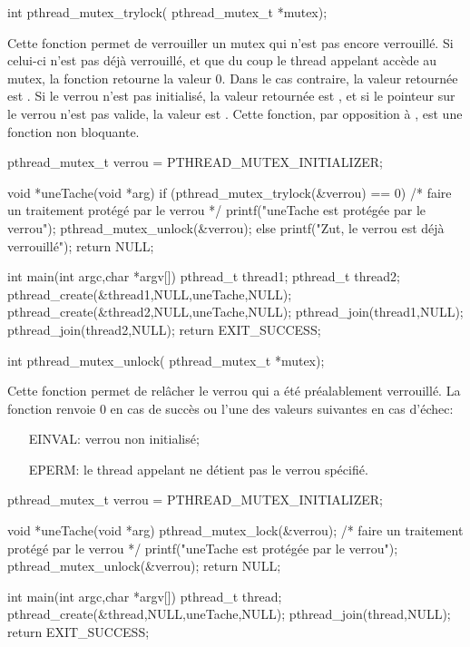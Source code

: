 \label{func:pthread_mutex_trylock}

\begin{codeblock}
int pthread_mutex_trylock(
    pthread_mutex_t *mutex);
\end{codeblock}

Cette fonction permet de verrouiller un mutex qui n'est pas encore verrouillé. Si celui-ci n'est pas déjà verrouillé, et que du coup le thread appelant accède au mutex, la fonction retourne la valeur 0. Dans le cas contraire, la valeur retournée est . Si le verrou n'est pas initialisé, la valeur retournée est , et si le pointeur sur le verrou n'est pas valide, la valeur est . Cette fonction, par opposition à , est une fonction non bloquante.

\begin{codeblock}
pthread_mutex_t verrou = PTHREAD_MUTEX_INITIALIZER;

void *uneTache(void *arg) {
  if (pthread_mutex_trylock(&verrou) == 0) {
    /* faire un traitement protégé par le verrou */
    printf("uneTache est protégée par le verrou\n");
    pthread_mutex_unlock(&verrou);
  }
  else
    printf("Zut, le verrou est déjà verrouillé\n");
  return NULL;
}


int main(int argc,char *argv[])
{
  pthread_t thread1;
  pthread_t thread2;
  pthread_create(&thread1,NULL,uneTache,NULL);
  pthread_create(&thread2,NULL,uneTache,NULL);
  pthread_join(thread1,NULL);
  pthread_join(thread2,NULL);
  return EXIT_SUCCESS;
}
\end{codeblock}


\label{func:pthread_mutex_unlock}

\begin{codeblock}
int pthread_mutex_unlock(
    pthread_mutex_t *mutex);
\end{codeblock}

Cette fonction permet de relâcher le verrou qui a été préalablement verrouillé. La fonction renvoie 0 en cas de succès ou l'une des valeurs suivantes en cas d'échec:
\begin{itemize}
\item[EINVAL:] verrou non initialisé;
\item[EPERM:] le thread appelant ne détient pas le verrou spécifié.
\end{itemize}

\begin{codeblock}
pthread_mutex_t verrou = PTHREAD_MUTEX_INITIALIZER;

void *uneTache(void *arg) {
  pthread_mutex_lock(&verrou);
  /* faire un traitement protégé par le verrou */
  printf("uneTache est protégée par le verrou\n");
  pthread_mutex_unlock(&verrou);
  return NULL;
}

int main(int argc,char *argv[])
{
  pthread_t thread;
  pthread_create(&thread,NULL,uneTache,NULL);
  pthread_join(thread,NULL);
  return EXIT_SUCCESS;
}
\end{codeblock}

